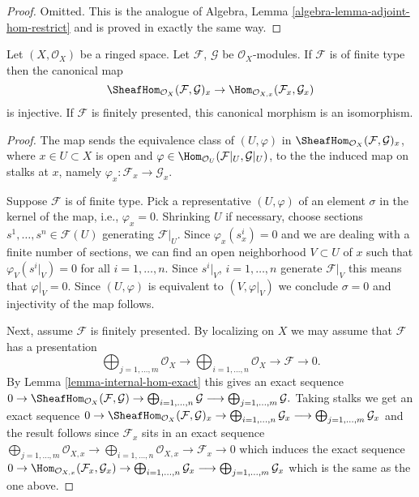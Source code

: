 \begin{proof}
Omitted. This is the analogue of
Algebra, Lemma \ref{algebra-lemma-adjoint-hom-restrict}
and is proved in exactly the same way.
\end{proof}

\begin{lemma}
\label{lemma-stalk-internal-hom}
Let $(X, \mathcal{O}_X)$ be a ringed space.
Let $\mathcal{F}$, $\mathcal{G}$ be $\mathcal{O}_X$-modules.
If $\mathcal{F}$ is of finite type then the canonical map
$$
\SheafHom_{\mathcal{O}_X}(\mathcal{F}, \mathcal{G})_x
\to
\Hom_{\mathcal{O}_{X, x}}(\mathcal{F}_x, \mathcal{G}_x)
$$
is injective.
If $\mathcal{F}$ is finitely presented,
this canonical morphism is an isomorphism.
\end{lemma}

\begin{proof}
The map sends the equivalence class of
$(U, \varphi)$ in $\SheafHom_{\mathcal{O}_X}(\mathcal{F}, \mathcal{G})_x$,
where $x \in U \subset X$ is open and
$\varphi \in \Hom_{\mathcal{O}_U}(\mathcal{F}|_U, \mathcal{G}|_U)$,
to the the induced map on stalks at $x$, namely
$\varphi_x : \mathcal{F}_x \to \mathcal{G}_x$.

\medskip\noindent
Suppose $\mathcal{F}$ is of finite type.
Pick a representative $(U, \varphi)$ of an element $\sigma$
in the kernel of the map, i.e., $\varphi_x = 0$.
Shrinking $U$ if necessary, choose sections
$s^1, \ldots, s^n \in \mathcal{F}(U)$ generating $\mathcal{F}|_U$.
Since $\varphi_x(s^i_x) = 0$
and we are dealing with a finite number of sections,
we can find an open neighborhood 
$V \subset U$ of $x$ such that $\varphi_V(s^i|_V)=0$
for all $i = 1, \ldots, n$. Since $s^i|_V$, $i = 1, \ldots, n$ generate
$\mathcal{F}|_V$ this means that $\varphi|_V = 0$.
Since $(U, \varphi)$ is equivalent to $(V, \varphi|_V)$
we conclude $\sigma = 0$ and injectivity of the map follows.

\medskip\noindent
Next, assume $\mathcal{F}$ is finitely presented.
By localizing on $X$ we may assume that $\mathcal{F}$ has a presentation
$$
\bigoplus\nolimits_{j = 1, \ldots, m}
\mathcal{O}_X
\longrightarrow
\bigoplus\nolimits_{i = 1, \ldots, n}
\mathcal{O}_X
\to
\mathcal{F}
\to
0.
$$
By Lemma \ref{lemma-internal-hom-exact} this gives an exact sequence
$
0 \to
\SheafHom_{\mathcal{O}_X}(\mathcal{F}, \mathcal{G}) \to
\bigoplus\nolimits_{i = 1, \ldots, n} \mathcal{G}
\longrightarrow
\bigoplus\nolimits_{j = 1, \ldots, m} \mathcal{G}.
$
Taking stalks we get an exact sequence
$
0 \to
\SheafHom_{\mathcal{O}_X}(\mathcal{F}, \mathcal{G})_x \to
\bigoplus\nolimits_{i = 1, \ldots, n} \mathcal{G}_x
\longrightarrow
\bigoplus\nolimits_{j = 1, \ldots, m} \mathcal{G}_x
$
and the result follows since $\mathcal{F}_x$ sits in
an exact sequence
$
\bigoplus\nolimits_{j = 1, \ldots, m}
\mathcal{O}_{X, x}
\longrightarrow
\bigoplus\nolimits_{i = 1, \ldots, n}
\mathcal{O}_{X, x}
\to
\mathcal{F}_x
\to
0
$
which induces the exact sequence
$
0 \to
\Hom_{\mathcal{O}_{X, x}}(\mathcal{F}_x, \mathcal{G}_x) \to
\bigoplus\nolimits_{i = 1, \ldots, n} \mathcal{G}_x
\longrightarrow
\bigoplus\nolimits_{j = 1, \ldots, m} \mathcal{G}_x
$
which is the same as the one above.
\end{proof}

